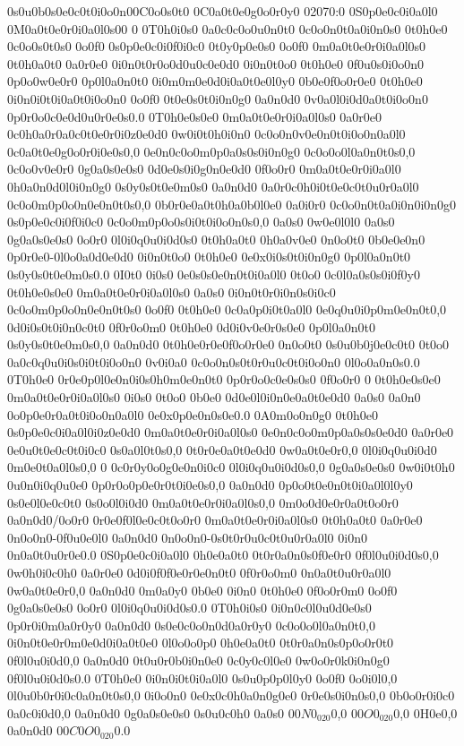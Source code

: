 0\0s0u0b0s0e0c0t0i0o0n0{0C0o0s0t0 0C0a0t0e0g0o0r0y0 02070:0 0S0p0e0c0i0a0l0 0M0a0t0e0r0i0a0l0s0}0
0
0T0h0i0s0 0a0c0c0o0u0n0t0 0c0o0n0t0a0i0n0s0 0t0h0e0 0c0o0s0t0s0 0o0f0 0s0p0e0c0i0f0i0c0 0t0y0p0e0s0 0o0f0 0m0a0t0e0r0i0a0l0s0 0t0h0a0t0 0a0r0e0 0i0n0t0r0o0d0u0c0e0d0 0i0n0t0o0 0t0h0e0 0f0u0s0i0o0n0 0p0o0w0e0r0 0p0l0a0n0t0 0i0m0m0e0d0i0a0t0e0l0y0 0b0e0f0o0r0e0 0t0h0e0 0i0n0i0t0i0a0t0i0o0n0 0o0f0 0t0e0s0t0i0n0g0 0a0n0d0 0v0a0l0i0d0a0t0i0o0n0 0p0r0o0c0e0d0u0r0e0s0.0 0T0h0e0s0e0 0m0a0t0e0r0i0a0l0s0 0a0r0e0 0c0h0a0r0a0c0t0e0r0i0z0e0d0 0w0i0t0h0i0n0 0c0o0n0v0e0n0t0i0o0n0a0l0 0c0a0t0e0g0o0r0i0e0s0,0 0e0n0c0o0m0p0a0s0s0i0n0g0 0c0o0o0l0a0n0t0s0,0 0c0o0v0e0r0 0g0a0s0e0s0 0d0e0s0i0g0n0e0d0 0f0o0r0 0m0a0t0e0r0i0a0l0 0h0a0n0d0l0i0n0g0 0s0y0s0t0e0m0s0 0a0n0d0 0a0r0c0h0i0t0e0c0t0u0r0a0l0 0c0o0m0p0o0n0e0n0t0s0,0 0b0r0e0a0t0h0a0b0l0e0 0a0i0r0 0c0o0n0t0a0i0n0i0n0g0 0s0p0e0c0i0f0i0c0 0c0o0m0p0o0s0i0t0i0o0n0s0,0 0a0s0 0w0e0l0l0 0a0s0 0g0a0s0e0s0 0o0r0 0l0i0q0u0i0d0s0 0t0h0a0t0 0h0a0v0e0 0n0o0t0 0b0e0e0n0 0p0r0e0-0l0o0a0d0e0d0 0i0n0t0o0 0t0h0e0 0e0x0i0s0t0i0n0g0 0p0l0a0n0t0 0s0y0s0t0e0m0s0.0 0I0t0 0i0s0 0e0s0s0e0n0t0i0a0l0 0t0o0 0c0l0a0s0s0i0f0y0 0t0h0e0s0e0 0m0a0t0e0r0i0a0l0s0 0a0s0 0i0n0t0r0i0n0s0i0c0 0c0o0m0p0o0n0e0n0t0s0 0o0f0 0t0h0e0 0c0a0p0i0t0a0l0 0e0q0u0i0p0m0e0n0t0,0 0d0i0s0t0i0n0c0t0 0f0r0o0m0 0t0h0e0 0d0i0v0e0r0s0e0 0p0l0a0n0t0 0s0y0s0t0e0m0s0,0 0a0n0d0 0t0h0e0r0e0f0o0r0e0 0n0o0t0 0s0u0b0j0e0c0t0 0t0o0 0a0c0q0u0i0s0i0t0i0o0n0 0v0i0a0 0c0o0n0s0t0r0u0c0t0i0o0n0 0l0o0a0n0s0.0 0T0h0e0 0r0e0p0l0e0n0i0s0h0m0e0n0t0 0p0r0o0c0e0s0s0 0f0o0r0 0 0t0h0e0s0e0 0m0a0t0e0r0i0a0l0s0 0i0s0 0t0o0 0b0e0 0d0e0l0i0n0e0a0t0e0d0 0a0s0 0a0n0 0o0p0e0r0a0t0i0o0n0a0l0 0e0x0p0e0n0s0e0.0 0A0m0o0n0g0 0t0h0e0 0s0p0e0c0i0a0l0i0z0e0d0 0m0a0t0e0r0i0a0l0s0 0e0n0c0o0m0p0a0s0s0e0d0 0a0r0e0 0e0u0t0e0c0t0i0c0 0s0a0l0t0s0,0 0t0r0e0a0t0e0d0 0w0a0t0e0r0,0 0l0i0q0u0i0d0 0m0e0t0a0l0s0,0 0 0c0r0y0o0g0e0n0i0c0 0l0i0q0u0i0d0s0,0 0g0a0s0e0s0 0w0i0t0h0 0u0n0i0q0u0e0 0p0r0o0p0e0r0t0i0e0s0,0 0a0n0d0 0p0o0t0e0n0t0i0a0l0l0y0 0s0e0l0e0c0t0 0s0o0l0i0d0 0m0a0t0e0r0i0a0l0s0,0 0m0o0d0e0r0a0t0o0r0 0a0n0d0/0o0r0 0r0e0f0l0e0c0t0o0r0 0m0a0t0e0r0i0a0l0s0 0t0h0a0t0 0a0r0e0 0n0o0n0-0f0u0e0l0 0a0n0d0 0n0o0n0-0s0t0r0u0c0t0u0r0a0l0 0i0n0 0n0a0t0u0r0e0.0 0S0p0e0c0i0a0l0 0h0e0a0t0 0t0r0a0n0s0f0e0r0 0f0l0u0i0d0s0,0 0w0h0i0c0h0 0a0r0e0 0d0i0f0f0e0r0e0n0t0 0f0r0o0m0 0n0a0t0u0r0a0l0 0w0a0t0e0r0,0 0a0n0d0 0m0a0y0 0b0e0 0i0n0 0t0h0e0 0f0o0r0m0 0o0f0 0g0a0s0e0s0 0o0r0 0l0i0q0u0i0d0s0.0 0T0h0i0s0 0i0n0c0l0u0d0e0s0 0p0r0i0m0a0r0y0 0a0n0d0 0s0e0c0o0n0d0a0r0y0 0c0o0o0l0a0n0t0,0 0i0n0t0e0r0m0e0d0i0a0t0e0 0l0o0o0p0 0h0e0a0t0 0t0r0a0n0s0p0o0r0t0 0f0l0u0i0d0,0 0a0n0d0 0t0u0r0b0i0n0e0 0c0y0c0l0e0 0w0o0r0k0i0n0g0 0f0l0u0i0d0s0.0 0T0h0e0 0i0n0i0t0i0a0l0 0s0u0p0p0l0y0 0o0f0 0o0i0l0,0 0l0u0b0r0i0c0a0n0t0s0,0 0i0o0n0 0e0x0c0h0a0n0g0e0 0r0e0s0i0n0s0,0 0b0o0r0i0c0 0a0c0i0d0,0 0a0n0d0 0g0a0s0e0s0 0s0u0c0h0 0a0s0 0$0N0_020$0,0 0$0O0_020$0,0 0H0e0,0 0a0n0d0 0$0C0O0_020$0.0
